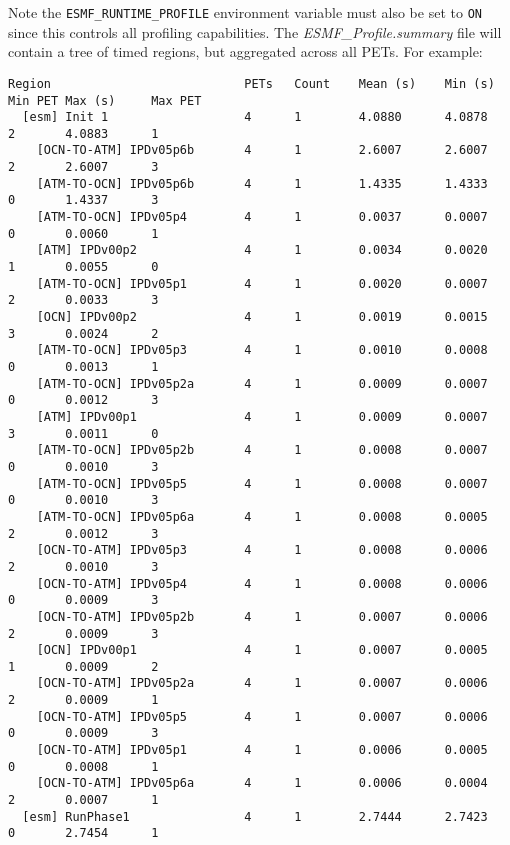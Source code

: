 Note the {\tt ESMF\_RUNTIME\_PROFILE} environment variable must
also be set to {\tt ON} since this controls all profiling capabilities.
The {\em ESMF\_Profile.summary} file will contain a tree of
timed regions, but aggregated across all PETs. For example:

\begin{verbatim}
Region                           PETs   Count    Mean (s)    Min (s)     Min PET Max (s)     Max PET
  [esm] Init 1                   4      1        4.0880      4.0878      2       4.0883      1      
    [OCN-TO-ATM] IPDv05p6b       4      1        2.6007      2.6007      2       2.6007      3      
    [ATM-TO-OCN] IPDv05p6b       4      1        1.4335      1.4333      0       1.4337      3      
    [ATM-TO-OCN] IPDv05p4        4      1        0.0037      0.0007      0       0.0060      1      
    [ATM] IPDv00p2               4      1        0.0034      0.0020      1       0.0055      0      
    [ATM-TO-OCN] IPDv05p1        4      1        0.0020      0.0007      2       0.0033      3      
    [OCN] IPDv00p2               4      1        0.0019      0.0015      3       0.0024      2      
    [ATM-TO-OCN] IPDv05p3        4      1        0.0010      0.0008      0       0.0013      1      
    [ATM-TO-OCN] IPDv05p2a       4      1        0.0009      0.0007      0       0.0012      3      
    [ATM] IPDv00p1               4      1        0.0009      0.0007      3       0.0011      0      
    [ATM-TO-OCN] IPDv05p2b       4      1        0.0008      0.0007      0       0.0010      3      
    [ATM-TO-OCN] IPDv05p5        4      1        0.0008      0.0007      0       0.0010      3      
    [ATM-TO-OCN] IPDv05p6a       4      1        0.0008      0.0005      2       0.0012      3      
    [OCN-TO-ATM] IPDv05p3        4      1        0.0008      0.0006      2       0.0010      3      
    [OCN-TO-ATM] IPDv05p4        4      1        0.0008      0.0006      0       0.0009      3      
    [OCN-TO-ATM] IPDv05p2b       4      1        0.0007      0.0006      2       0.0009      3      
    [OCN] IPDv00p1               4      1        0.0007      0.0005      1       0.0009      2      
    [OCN-TO-ATM] IPDv05p2a       4      1        0.0007      0.0006      2       0.0009      1      
    [OCN-TO-ATM] IPDv05p5        4      1        0.0007      0.0006      0       0.0009      3      
    [OCN-TO-ATM] IPDv05p1        4      1        0.0006      0.0005      0       0.0008      1      
    [OCN-TO-ATM] IPDv05p6a       4      1        0.0006      0.0004      2       0.0007      1      
  [esm] RunPhase1                4      1        2.7444      2.7423      0       2.7454      1      

\end{verbatim}
